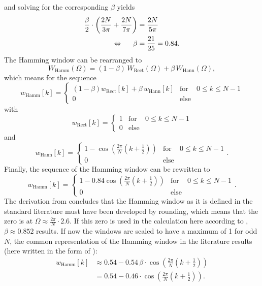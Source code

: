 \documentclass[11pt,a4paper,DIV=12]{scrartcl}
\begin{document}
%
and solving for the corresponding $\beta$ yields
%
\begin{align}
\frac{\beta}{2}\cdot\left(\frac{2N}{3\pi}+\frac{2N}{7\pi}\right)&=\frac{2N}{5\pi}\\
\Leftrightarrow \hspace{5mm} \beta&=\frac{21}{25}=0.84.
\end{align}
%
The Hamming window can be rearranged to
%
\begin{equation}
W_{\text{Hamm}}(\Omega) = (1-\beta)\,W_{\text{Rect}}(\Omega) + \beta\,W_{\text{Hann}}(\Omega),
\end{equation}
%
which means for the sequence
%
\begin{equation}
w_{\text{Hamm}}[k]=\left\{\begin{matrix}(1-\beta)w_{\text{Rect}}[k]+\beta\,w_{\text{Hann}}[k] & \text{for} & 0\leq k\leq N-1\\0 & \text{else} &\end{matrix}\right.
\end{equation}
%
with
%
\begin{equation}
w_{\text{Rect}}[k]=\left\{\begin{matrix}1 & \text{for} & 0\leq k\leq N-1\\0 & \text{else} &\end{matrix}\right.
\end{equation}
%
and
%
\begin{equation}
w_{\text{Hann}}[k]=\left\{\begin{matrix}1-\cos\left(\frac{2\pi}{N}\left(k+\frac{1}{2}\right)\right) & \text{for} & 0\leq k\leq N-1\\0 & \text{else} &\end{matrix}\right..
\end{equation}
%
Finally, the sequence of the Hamming window can be rewritten to
%
\begin{equation}
w_{\text{Hamm}}[k]=\left\{\begin{matrix}1-0.84\cos\left(\frac{2\pi}{N}\left(k+\frac{1}{2}\right)\right) & \text{for} & 0\leq k\leq N-1\\0 & \text{else} &\end{matrix}\right..
\end{equation}
%
The derivation from \cite[p.~62]{Harris1978} concludes that the Hamming window
as it is defined in the standard literature must have been developed by
rounding, which means that the zero is at $\Omega\approx\frac{2\pi}{N}\cdot2.6$.
%
If this zero is used in the calculation here according to \cite{Moeser2011},
$\beta\approx0.852$ results.
%
If now the windows are scaled to have a maximum of 1 for odd $N$, the common
representation of the Hamming window in the literature results
(here written in the form of \cite{Moeser2011}):
%
\begin{align}
w_{\text{Hamm}}[k]&\approx0.54-0.54\,\beta\cdot\cos\left(\frac{2\pi}{N}\left(k+\frac{1}{2}\right)\right)\\
&=0.54-0.46\cdot\cos\left(\frac{2\pi}{N}\left(k+\frac{1}{2}\right)\right).
\end{align}
\end{document}
